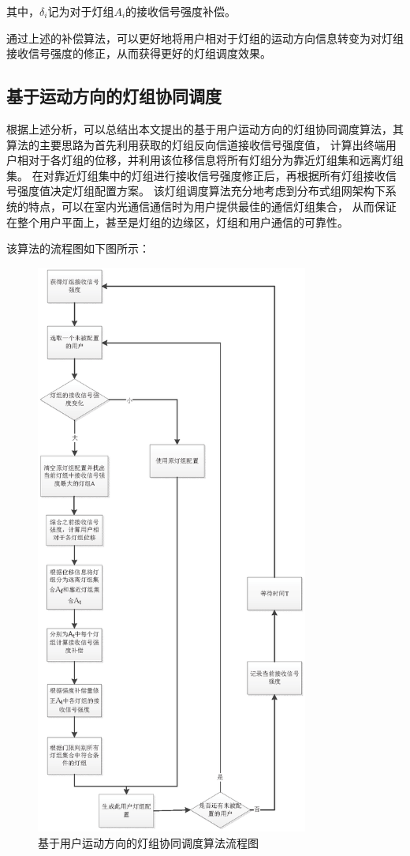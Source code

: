 其中，$\delta _i$记为对于灯组$A_{i}$的接收信号强度补偿。

通过上述的补偿算法，可以更好地将用户相对于灯组的运动方向信息转变为对灯组接收信号强度的修正，从而获得更好的灯组调度效果。

\subsection{基于运动方向的灯组协同调度}
根据上述分析，可以总结出本文提出的基于用户运动方向的灯组协同调度算法，其算法的主要思路为首先利用获取的灯组反向信道接收信号强度值，
计算出终端用户相对于各灯组的位移，并利用该位移信息将所有灯组分为靠近灯组集和远离灯组集。
在对靠近灯组集中的灯组进行接收信号强度修正后，再根据所有灯组接收信号强度值决定灯组配置方案。
该灯组调度算法充分地考虑到分布式组网架构下系统的特点，可以在室内光通信通信时为用户提供最佳的通信灯组集合，
从而保证在整个用户平面上，甚至是灯组的边缘区，灯组和用户通信的可靠性。

该算法的流程图如下图所示：

\begin{figure}[htbp]
    \centering
	\includegraphics[width=0.8\textwidth]{figures/chapter-4/DistributionSchemeFlow.eps}
	\caption{基于用户运动方向的灯组协同调度算法流程图}
	\label{fig:distribution-scheme-flow}
\end{figure}

